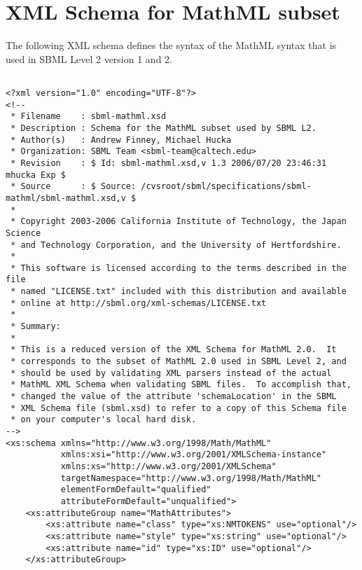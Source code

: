 
\section{XML Schema for MathML subset}
\label{apdx:mathml-subset-schema}

The following XML schema defines the syntax of the MathML syntax
that is used in SBML Level 2 version 1 and 2.

\begin{footnotesize}
\tightspacing
\begin{verbatim}

<?xml version="1.0" encoding="UTF-8"?>
<!--
 * Filename    : sbml-mathml.xsd
 * Description : Schema for the MathML subset used by SBML L2.
 * Author(s)   : Andrew Finney, Michael Hucka
 * Organization: SBML Team <sbml-team@caltech.edu>
 * Revision    : $ Id: sbml-mathml.xsd,v 1.3 2006/07/20 23:46:31 mhucka Exp $
 * Source      : $ Source: /cvsroot/sbml/specifications/sbml-mathml/sbml-mathml.xsd,v $
 *
 * Copyright 2003-2006 California Institute of Technology, the Japan Science
 * and Technology Corporation, and the University of Hertfordshire.
 *
 * This software is licensed according to the terms described in the file
 * named "LICENSE.txt" included with this distribution and available
 * online at http://sbml.org/xml-schemas/LICENSE.txt
 *
 * Summary:
 * 
 * This is a reduced version of the XML Schema for MathML 2.0.  It 
 * corresponds to the subset of MathML 2.0 used in SBML Level 2, and
 * should be used by validating XML parsers instead of the actual
 * MathML XML Schema when validating SBML files.  To accomplish that,
 * changed the value of the attribute 'schemaLocation' in the SBML
 * XML Schema file (sbml.xsd) to refer to a copy of this Schema file
 * on your computer's local hard disk.
-->
<xs:schema xmlns="http://www.w3.org/1998/Math/MathML" 
           xmlns:xsi="http://www.w3.org/2001/XMLSchema-instance" 
           xmlns:xs="http://www.w3.org/2001/XMLSchema" 
           targetNamespace="http://www.w3.org/1998/Math/MathML" 
           elementFormDefault="qualified" 
           attributeFormDefault="unqualified">
    <xs:attributeGroup name="MathAttributes">
        <xs:attribute name="class" type="xs:NMTOKENS" use="optional"/>
        <xs:attribute name="style" type="xs:string" use="optional"/>
        <xs:attribute name="id" type="xs:ID" use="optional"/>
    </xs:attributeGroup>

\end{verbatim}
\end{footnotesize}
